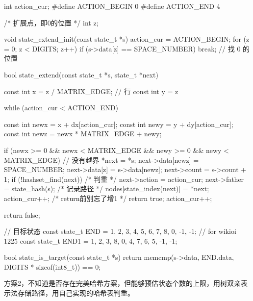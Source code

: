\begin{Codex}[label=eight_digits_bfs.c]
int action_cur;
#define ACTION_BEGIN 0
#define ACTION_END 4

/* 扩展点，即0的位置 */
int z;

void state_extend_init(const state_t *s) {
    action_cur = ACTION_BEGIN;
    for (z = 0; z < DIGITS; z++) {
        if (s->data[z] == SPACE_NUMBER) {
            break;  // 找 0 的位置
        }
    }
}

bool state_extend(const state_t *s, state_t *next) {
    const int x = z / MATRIX_EDGE; // 行
    const int y = z %

    while (action_cur < ACTION_END) {
        const int newx = x + dx[action_cur];
        const int newy = y + dy[action_cur];
        const int newz = newx * MATRIX_EDGE + newy;

        if (newx >= 0 && newx < MATRIX_EDGE && newy >= 0 &&
                newy < MATRIX_EDGE) { // 没有越界
            *next = *s;
            next->data[newz] = SPACE_NUMBER;
            next->data[z] = s->data[newz];
            next->count = s->count + 1;
            if (!hashset_find(next)) { /* 判重 */
                next->action = action_cur;
                next->father = state_hash(s);
                /* 记录路径 */
                nodes[state_index(next)] = *next;
                action_cur++; /* return前别忘了增1 */
                return true;
            }
        }
        action_cur++;
    }
    return false;
}

// 目标状态
const state_t END = {{1, 2, 3, 4, 5, 6, 7, 8, 0}, -1, -1};
// for wikioi 1225
const state_t END1 = {{1, 2, 3, 8, 0, 4, 7, 6, 5}, -1, -1};

bool state_is_target(const state_t *s) {
    return memcmp(s->data, END.data, DIGITS * sizeof(int8_t)) == 0;
}
\end{Codex}

方案2，不知道是否存在完美哈希方案，但能够预估状态个数的上限，用树双亲表示法存储路径，用自己实现的哈希表判重。


